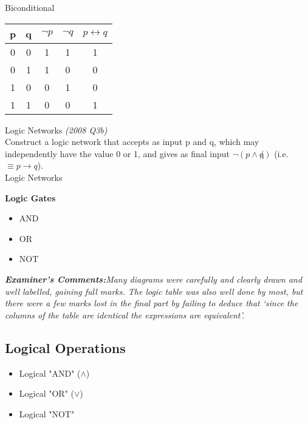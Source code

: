 \documentclass[12pt]{article}
\begin{document}
{Biconditional}

\begin{tabular}{|c|c|c|c|c|}
\hline  \phantom{sp} p \phantom{sp} & \phantom{sp} q \phantom{sp} & $\neg p$ & $\neg q$ & $p \leftrightarrow q$ \\ 
\hline  0& 0 & 1& 1 & 1\\ 
\hline  0& 1 &  1& 0& 0\\ 
\hline  1& 0 &  0& 1& 0\\ 
\hline  1& 1 &  0 & 0& 1\\ 
\hline 
\end{tabular} 



{Logic Networks }
\emph{(2008 Q3b)}\\
Construct a logic network that accepts as input p and q, which may independently have the value 0 or 1, and
gives as final input $\neg(p \wedge \not q)$ (i.e. $\equiv p \rightarrow q$).\\

{Logic Networks }

\textbf{Logic Gates}
\begin{itemize}
\item AND
\item OR
\item NOT
\end{itemize}


\emph{\textbf{Examiner's Comments:}Many
diagrams were carefully and clearly drawn and well labelled, gaining full
marks. The logic table was also well done by most, but there were a few marks
lost in the final part by failing to deduce that ‘since the columns of the table are
identical the expressions are equivalent’.}




\subsection{Logical Operations}

\begin{itemize}
\item Logical "AND" ($\wedge$)
\item Logical "OR" ($\vee$)
\item Logical "NOT" 
\end{itemize}
\newpage
\end{document}
